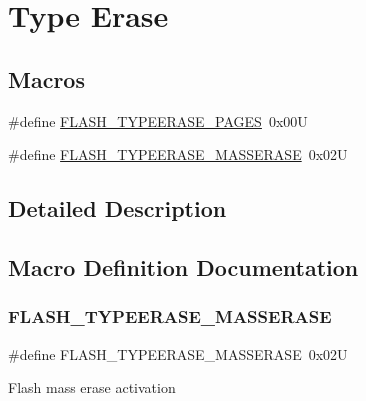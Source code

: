 \hypertarget{group___f_l_a_s_h_ex___type___erase}{}\section{Type Erase}
\label{group___f_l_a_s_h_ex___type___erase}
\subsection*{Macros}
\begin{DoxyCompactItemize}
\item 
\#define \hyperlink{group___f_l_a_s_h_ex___type___erase_ga3664ce55155ec4990873c51737d787ce}{F\+L\+A\+S\+H\+\_\+\+T\+Y\+P\+E\+E\+R\+A\+S\+E\+\_\+\+P\+A\+G\+ES}~0x00U
\item 
\#define \hyperlink{group___f_l_a_s_h_ex___type___erase_ga9bc03534e69c625e1b4f0f05c3852243}{F\+L\+A\+S\+H\+\_\+\+T\+Y\+P\+E\+E\+R\+A\+S\+E\+\_\+\+M\+A\+S\+S\+E\+R\+A\+SE}~0x02U
\end{DoxyCompactItemize}


\subsection{Detailed Description}


\subsection{Macro Definition Documentation}
\mbox{\label{group___f_l_a_s_h_ex___type___erase_ga9bc03534e69c625e1b4f0f05c3852243}} 
\subsubsection{\texorpdfstring{F\+L\+A\+S\+H\+\_\+\+T\+Y\+P\+E\+E\+R\+A\+S\+E\+\_\+\+M\+A\+S\+S\+E\+R\+A\+SE}{FLASH\_TYPEERASE\_MASSERASE}}
{\footnotesize\ttfamily \#define F\+L\+A\+S\+H\+\_\+\+T\+Y\+P\+E\+E\+R\+A\+S\+E\+\_\+\+M\+A\+S\+S\+E\+R\+A\+SE~0x02U}

Flash mass erase activation 

